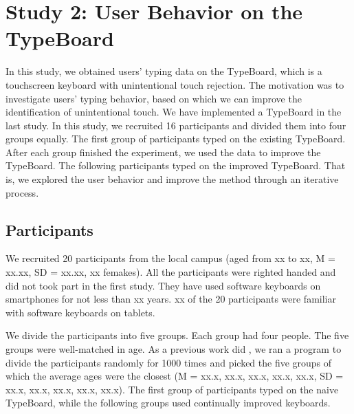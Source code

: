 \section{Study 2: User Behavior on the TypeBoard}

In this study, we obtained users' typing data on the TypeBoard, which is a touchscreen keyboard with unintentional touch rejection. The motivation was to investigate users' typing behavior, based on which we can improve the identification of unintentional touch. We have implemented a TypeBoard in the last study. In this study, we recruited 16 participants and divided them into four groups equally. The first group of participants typed on the existing TypeBoard. After each group finished the experiment, we used the data to improve the TypeBoard. The following participants typed on the improved TypeBoard. That is, we explored the user behavior and improve the method through an iterative process.


\subsection{Participants}

We recruited 20 participants from the local campus (aged from xx to xx, M = xx.xx, SD = xx.xx, xx femakes). All the participants were righted handed and did not took part in the first study. They have used software keyboards on smartphones for not less than xx years. xx of the 20 participants were familiar with software keyboards on tablets.

We divide the participants into five groups. Each group had four people. The five groups were well-matched in age. As a previous work did \cite{2020-QwertyRing},  we ran a program to divide the participants randomly for 1000 times and picked the five groups of which the average ages were the closest (M = xx.x, xx.x, xx.x, xx.x, xx.x, SD = xx.x, xx.x, xx.x, xx.x, xx.x). The first group of participants typed on the naive TypeBoard, while the following groups used continually improved keyboards.

